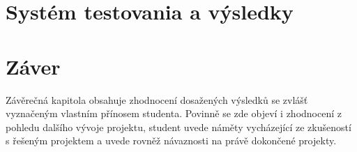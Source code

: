 \chapter{Systém testovania a výsledky}\label{ch:kap5}

\chapter{Záver}\label{ch:kap6}
Závěrečná kapitola obsahuje zhodnocení dosažených výsledků se zvlášť vyznačeným vlastním přínosem studenta. Povinně se zde objeví i zhodnocení z pohledu dalšího vývoje projektu, student uvede náměty vycházející ze zkušeností s řešeným projektem a uvede rovněž návaznosti na právě dokončené projekty.

